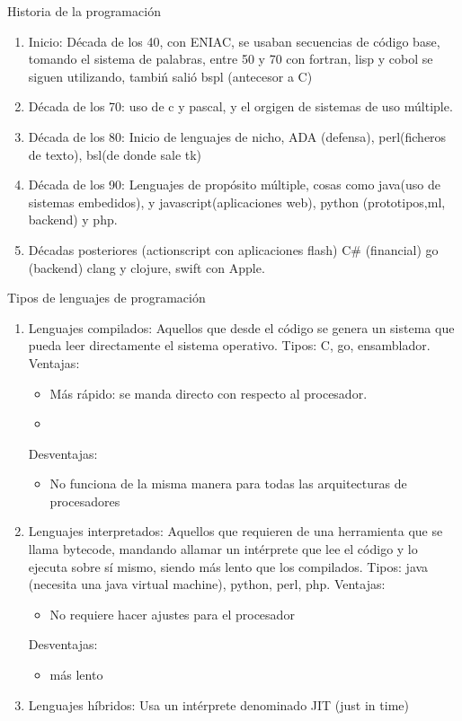 \documentclass{article}
\begin{document}
  \begin{center}
    Historia de la programación
  \end{center}
  \begin{enumerate}
    \item Inicio: Década de los 40, con ENIAC, se usaban secuencias de código base, tomando el sistema de palabras, entre 50 y 70 con fortran, lisp y cobol se siguen utilizando, tambiń salió bspl (antecesor a C)
    \item Década de los 70: uso de c y pascal, y el orgigen de sistemas de uso múltiple.
    \item Década de los 80: Inicio de lenguajes de nicho, ADA (defensa), perl(ficheros de texto), bsl(de donde sale tk)
    \item Década de los 90: Lenguajes de propósito múltiple, cosas como java(uso de sistemas embedidos), y javascript(aplicaciones web), python (prototipos,ml, backend) y php.
    \item Décadas posteriores (actionscript con aplicaciones flash) C\# (financial) go (backend) clang y clojure, swift con Apple.
  \end{enumerate}
  \begin{center}
    Tipos de lenguajes de programación
  \end{center}

  \begin{enumerate}
    \item Lenguajes compilados: Aquellos que desde el código se genera un sistema que pueda leer directamente el sistema operativo. Tipos: C, go, ensamblador. Ventajas:
      \begin{itemize}
        \item Más rápido: se manda directo con respecto al procesador.
        \item 
      \end{itemize} 
      Desventajas: 
      \begin{itemize}
        \item No funciona de la misma manera para todas las arquitecturas de procesadores
      \end{itemize}
    \item Lenguajes interpretados: Aquellos que requieren de una herramienta que se llama bytecode, mandando allamar un intérprete que lee el código y lo ejecuta sobre sí mismo, siendo más lento que los compilados. Tipos: java (necesita una java virtual machine), python, perl, php.
      Ventajas: 
      \begin{itemize}
        \item No requiere hacer ajustes para el procesador
      \end{itemize}
      Desventajas:
      \begin{itemize}
        \item más lento
      \end{itemize}
    \item Lenguajes híbridos: Usa un intérprete denominado JIT (just in time)
  \end{enumerate}
\end{document}

